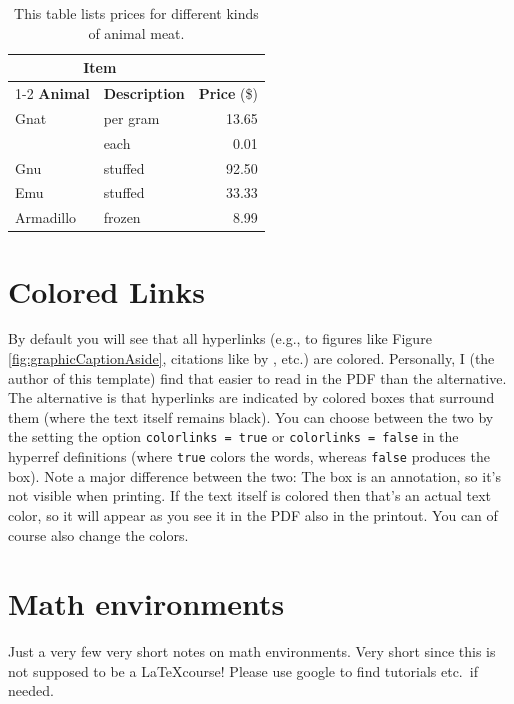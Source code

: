 \begin{table}[!ht]
  \begin{tabular}{llr}
    \toprule
    \multicolumn{2}{c}{\textbf{Item}} \\
    \cmidrule(r){1-2}
    \textbf{Animal} & \textbf{Description} & \textbf{Price} (\$)\\
    \midrule
    Gnat            & per gram             & 13.65      \\
                    & each                 & 0.01       \\
    Gnu             & stuffed              & 92.50      \\
    Emu             & stuffed              & 33.33      \\
    Armadillo       & frozen               & 8.99       \\
    \bottomrule
  \end{tabular}
  \caption{This table lists prices for different kinds of animal meat.\label{tab:meatPrices}}
\end{table}




\section{Colored Links}

By default you will see that all hyperlinks (e.g., to figures like Figure \ref{fig:graphicCaptionAside}, citations like by \cite{Smith2021Wubalubadubdub}, etc.) are colored. Personally, I (the author of this template) find that easier to read in the PDF than the alternative. The alternative is that hyperlinks are indicated by colored boxes that surround them (where the text itself remains black). You can choose between the two by the setting the option \verb!colorlinks = true! or \verb!colorlinks = false! in the hyperref definitions (where \verb!true! colors the words, whereas \verb!false! produces the box). Note a major difference between the two: The box is an annotation, so it's not visible when printing. If the text itself is colored then that's an actual text color, so it will appear as you see it in the PDF also in the printout. You can of course also change the colors.




\section{Math environments}

Just a very few very short notes on math environments. Very short since this is not supposed to be a \LaTeX{course}! Please use google to find tutorials etc.\ if needed.


